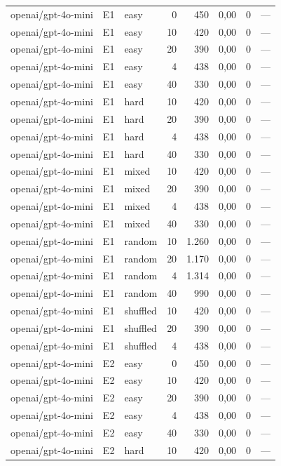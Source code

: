 \begin{table}[htbp]
\begin{tabular}{lllrrrrr}
openai/gpt-4o-mini & E1 & easy & 0 & 450 & 0,00 & 0 & — \\
openai/gpt-4o-mini & E1 & easy & 10 & 420 & 0,00 & 0 & — \\
openai/gpt-4o-mini & E1 & easy & 20 & 390 & 0,00 & 0 & — \\
openai/gpt-4o-mini & E1 & easy & 4 & 438 & 0,00 & 0 & — \\
openai/gpt-4o-mini & E1 & easy & 40 & 330 & 0,00 & 0 & — \\
openai/gpt-4o-mini & E1 & hard & 10 & 420 & 0,00 & 0 & — \\
openai/gpt-4o-mini & E1 & hard & 20 & 390 & 0,00 & 0 & — \\
openai/gpt-4o-mini & E1 & hard & 4 & 438 & 0,00 & 0 & — \\
openai/gpt-4o-mini & E1 & hard & 40 & 330 & 0,00 & 0 & — \\
openai/gpt-4o-mini & E1 & mixed & 10 & 420 & 0,00 & 0 & — \\
openai/gpt-4o-mini & E1 & mixed & 20 & 390 & 0,00 & 0 & — \\
openai/gpt-4o-mini & E1 & mixed & 4 & 438 & 0,00 & 0 & — \\
openai/gpt-4o-mini & E1 & mixed & 40 & 330 & 0,00 & 0 & — \\
openai/gpt-4o-mini & E1 & random & 10 & 1.260 & 0,00 & 0 & — \\
openai/gpt-4o-mini & E1 & random & 20 & 1.170 & 0,00 & 0 & — \\
openai/gpt-4o-mini & E1 & random & 4 & 1.314 & 0,00 & 0 & — \\
openai/gpt-4o-mini & E1 & random & 40 & 990 & 0,00 & 0 & — \\
openai/gpt-4o-mini & E1 & shuffled & 10 & 420 & 0,00 & 0 & — \\
openai/gpt-4o-mini & E1 & shuffled & 20 & 390 & 0,00 & 0 & — \\
openai/gpt-4o-mini & E1 & shuffled & 4 & 438 & 0,00 & 0 & — \\
openai/gpt-4o-mini & E2 & easy & 0 & 450 & 0,00 & 0 & — \\
openai/gpt-4o-mini & E2 & easy & 10 & 420 & 0,00 & 0 & — \\
openai/gpt-4o-mini & E2 & easy & 20 & 390 & 0,00 & 0 & — \\
openai/gpt-4o-mini & E2 & easy & 4 & 438 & 0,00 & 0 & — \\
openai/gpt-4o-mini & E2 & easy & 40 & 330 & 0,00 & 0 & — \\
openai/gpt-4o-mini & E2 & hard & 10 & 420 & 0,00 & 0 & — \\

\end{tabular}
\end{table}
